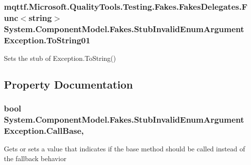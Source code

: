 \hypertarget{class_system_1_1_component_model_1_1_fakes_1_1_stub_invalid_enum_argument_exception_acd972f0b131cf5b9b9eb5f5c77f327d0}{
\subsubsection[{To\-String01}]{\setlength{\rightskip}{0pt plus 5cm}mqttf.\-Microsoft.\-Quality\-Tools.\-Testing.\-Fakes.\-Fakes\-Delegates.\-Func$<$string$>$ System.\-Component\-Model.\-Fakes.\-Stub\-Invalid\-Enum\-Argument\-Exception.\-To\-String01}}\label{class_system_1_1_component_model_1_1_fakes_1_1_stub_invalid_enum_argument_exception_acd972f0b131cf5b9b9eb5f5c77f327d0}


Sets the stub of Exception.\-To\-String()



\subsection{Property Documentation}
\hypertarget{class_system_1_1_component_model_1_1_fakes_1_1_stub_invalid_enum_argument_exception_a153bd0fa7752261de63764b198e29501}{
\subsubsection[{Call\-Base}]{\setlength{\rightskip}{0pt plus 5cm}bool System.\-Component\-Model.\-Fakes.\-Stub\-Invalid\-Enum\-Argument\-Exception.\-Call\-Base\hspace{0.3cm}{\ttfamily [get]}, {\ttfamily [set]}}}\label{class_system_1_1_component_model_1_1_fakes_1_1_stub_invalid_enum_argument_exception_a153bd0fa7752261de63764b198e29501}


Gets or sets a value that indicates if the base method should be called instead of the fallback behavior

